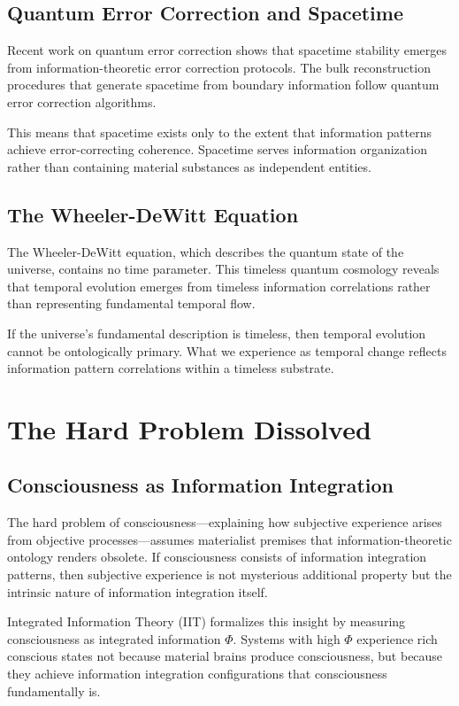 \documentclass[12pt]{article}
\begin{document}
\subsection{Quantum Error Correction and Spacetime}

Recent work on quantum error correction shows that spacetime stability emerges from information-theoretic error correction protocols. The bulk reconstruction procedures that generate spacetime from boundary information follow quantum error correction algorithms.

This means that spacetime exists only to the extent that information patterns achieve error-correcting coherence. Spacetime serves information organization rather than containing material substances as independent entities.

\subsection{The Wheeler-DeWitt Equation}

The Wheeler-DeWitt equation, which describes the quantum state of the universe, contains no time parameter. This timeless quantum cosmology reveals that temporal evolution emerges from timeless information correlations rather than representing fundamental temporal flow.

If the universe's fundamental description is timeless, then temporal evolution cannot be ontologically primary. What we experience as temporal change reflects information pattern correlations within a timeless substrate.

\section{The Hard Problem Dissolved}

\subsection{Consciousness as Information Integration}

The hard problem of consciousness—explaining how subjective experience arises from objective processes—assumes materialist premises that information-theoretic ontology renders obsolete. If consciousness consists of information integration patterns, then subjective experience is not mysterious additional property but the intrinsic nature of information integration itself.

Integrated Information Theory (IIT) formalizes this insight by measuring consciousness as integrated information $\Phi$. Systems with high $\Phi$ experience rich conscious states not because material brains produce consciousness, but because they achieve information integration configurations that consciousness fundamentally is.
\end{document}
